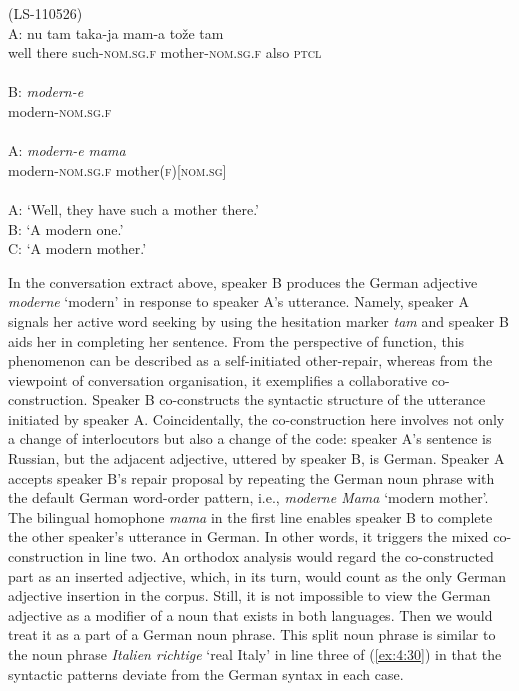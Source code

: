 \ea
\label{ex:4:34}
(LS-110526) \\
 \gll A: nu tam taka-ja mam-a tože tam \\
	{} well there such-\textsc{nom.sg.f} mother-\textsc{nom.sg.f} also \textsc{ptcl} \\
\glt \hfill \\
 \gll B: \textit{modern-e} \\
	{} modern-\textsc{nom.sg.f} \\
\glt \hfill \\
 \gll A: \textit{modern-e} \textit{mama} \\
	{} modern-\textsc{nom.sg.f} mother(\textsc{f})[\textsc{nom.sg}] \\
\glt \hfill \\
A: `Well, they have such a mother there.'\\
B: `A modern one.'\\
C: `A modern mother.'\\
\z

\begin{sloppypar}
\noindent In the conversation extract above, speaker B produces the German adjective \textit{moderne} `modern' in response to speaker A's utterance. Namely, speaker A signals her active word seeking by using the hesitation marker \textit{tam} and speaker B aids her in completing her sentence. From the perspective of function, this phenomenon can be described as a self-initiated other-repair, whereas from the viewpoint of conversation organisation, it exemplifies a collaborative co-construction. Speaker B co-constructs the syntactic structure of the utterance initiated by speaker A. Coincidentally, the co-construction here involves not only a change of interlocutors but also a change of the code: speaker A's sentence is Russian, but the adjacent adjective, uttered by speaker B, is German. Speaker A accepts speaker B's repair proposal by repeating the German noun phrase with the default German word-order pattern, i.e., \textit{moderne Mama} `modern mother'. The bilingual homophone \textit{mama} in the first line enables speaker B to complete the other speaker's utterance in German. In other words, it triggers the mixed co-construction in line two. An orthodox analysis would regard the co-constructed part as an inserted adjective, which, in its turn, would count as the only German adjective insertion in the corpus. Still, it is not impossible to view the German adjective as a modifier of a noun that exists in both languages. Then we would treat it as a part of a German noun phrase. This split noun phrase is similar to the noun phrase \textit{Italien richtige} `real Italy' in line three of (\ref{ex:4:30}) in that the syntactic patterns deviate from the German syntax in each case.
\end{sloppypar}

